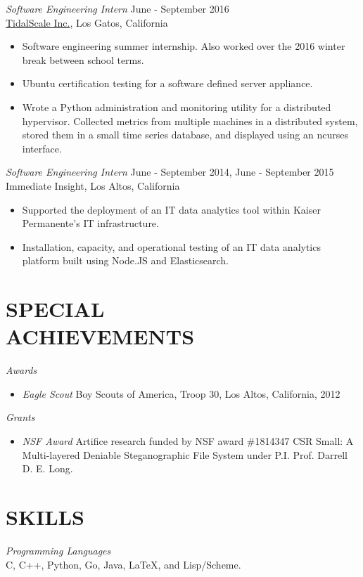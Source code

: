 \documentclass[margin, 10pt]{res} %
\begin{document}
\begin{resume}
{\sl Software Engineering Intern} \hfill June - September 2016 \\
\href{https://www.tidalscale.com}{TidalScale Inc.}, Los Gatos, California
\begin{itemize}
\item Software engineering summer internship. Also worked over the 2016 winter break between school terms. 
\item Ubuntu certification testing for a software defined server appliance.
\item Wrote a Python administration and monitoring utility for a distributed hypervisor. Collected metrics from multiple machines in a distributed system, stored them in a small time series database, and displayed using an ncurses interface.
\end{itemize}

{\sl Software Engineering Intern} \hfill June - September 2014, June - September 2015 \\
Immediate Insight, Los Altos, California
\begin{itemize}
\item Supported the deployment of an IT data analytics tool within Kaiser Permanente's IT infrastructure.
\item Installation, capacity, and operational testing of an IT data analytics platform built using Node.JS and Elasticsearch. 
\end{itemize}

\section{SPECIAL \\ ACHIEVEMENTS} 
{\sl Awards}
\begin{itemize}
\item \emph{Eagle Scout} Boy Scouts of America, Troop 30, Los Altos, California, 2012
\end{itemize}
{\sl Grants}
\begin{itemize}
\item \emph{NSF Award} Artifice research funded by NSF award \#1814347 CSR Small: A Multi-layered Deniable Steganographic File System under P.I. Prof. Darrell D. E. Long.
\end{itemize}

\section{SKILLS}
{\sl Programming Languages}\\
C, C++, Python, Go, Java, LaTeX, and Lisp/Scheme.


\end{resume}
\end{document}
